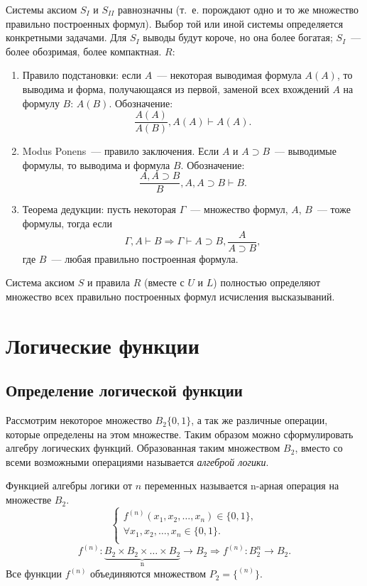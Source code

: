 \documentclass[a4paper,12pt]{report}
\begin{document}
	Системы аксиом $S_{I}$ и $S_{II}$ равнозначны (т.~е. порождают одно и то же
	множество правильно построенных формул). Выбор той или иной системы
	определяется конкретными задачами. Для $S_{I}$ выводы будут короче, но она
	более богатая; $S_{I}$~--- более обозримая, более компактная.
	$ R $:
	\begin{enumerate}
		\item Правило подстановки: если $ \textit{A} $~--- некоторая выводимая
			формула $ \textit{A}(A) $, то выводима и форма, получающаяся из первой,
			заменой всех вхождений $ \textit{A} $ на формулу $ \textit{B} $:
			$ \textit{A}(\textit{B}) $. Обозначение:
			$$ \frac{\textit{A}(A)}{\textit{A}(B)}, \textit{A}(A) \vdash
			\textit{A}(A). $$
		\item Modus Ponens~--- правило заключения. Если $ A $ и $ A \supset B $~---
			выводимые формулы, то выводима и формула $ B $. Обозначение:
			$$ \frac{A, A \supset B}{B}, A, A \supset B \vdash B. $$
		\item Теорема дедукции: пусть некоторая $ \Gamma $~--- множество формул, $
			A $, $ B $~--- тоже формулы, тогда если
			$$ \Gamma, A \vdash B \Rightarrow \Gamma \vdash A \supset B,
			\frac{A}{A \supset B}, $$
			где $ B $~--- любая правильно построенная формула.
	\end{enumerate}
	Система аксиом $ S $ и правила $ R $ (вместе с $ U $ и $ L $) полностью
	определяют множество всех правильно построенных формул исчисления
	высказываний.


\section{Логические функции}


\subsection{Определение логической функции}

	Рассмотрим некоторое множество $ B_2\{0,1\} $, а так же различные операции,
	которые определены на этом множестве. Таким образом можно сформулировать
	алгебру логических функций. Образованная таким множеством $ B_2 $, вместо со
	всеми возможными операциями называется \textit{алгеброй логики}.

	Функцией алгебры логики от $ n $ переменных называется n-арная операция
	на множестве $ B_2 $.
	$$
	\begin{cases}
		f^{(n)}(x_1, x_2, \dots, x_n) \in \{0, 1\},\\
		\forall x_1, x_2, \dots, x_n \in \{0, 1\}.\\
	\end{cases}
	$$
	$$
	f^{(n)}: \underbrace{B_2 \times B_2 \times \dots \times B_2}_\text{n}
	\rightarrow B_2 \Rightarrow f^{(n)} : B^n_2 \rightarrow B_2.
	$$
	Все функции $ f^{(n)} $ объединяются множеством $ P_2 = \{^{(n)}\} $.
\end{document}

